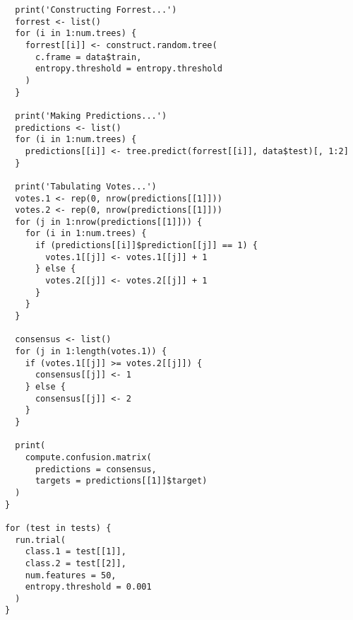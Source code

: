 \documentclass{article}
\begin{document}
\begin{verbatim}
  print('Constructing Forrest...')
  forrest <- list()
  for (i in 1:num.trees) {
    forrest[[i]] <- construct.random.tree(
      c.frame = data$train,
      entropy.threshold = entropy.threshold
    )
  }

  print('Making Predictions...')
  predictions <- list()
  for (i in 1:num.trees) {
    predictions[[i]] <- tree.predict(forrest[[i]], data$test)[, 1:2]
  }

  print('Tabulating Votes...')
  votes.1 <- rep(0, nrow(predictions[[1]]))
  votes.2 <- rep(0, nrow(predictions[[1]]))
  for (j in 1:nrow(predictions[[1]])) {
    for (i in 1:num.trees) {
      if (predictions[[i]]$prediction[[j]] == 1) {
        votes.1[[j]] <- votes.1[[j]] + 1
      } else {
        votes.2[[j]] <- votes.2[[j]] + 1
      }
    }
  }

  consensus <- list()
  for (j in 1:length(votes.1)) {
    if (votes.1[[j]] >= votes.2[[j]]) {
      consensus[[j]] <- 1
    } else {
      consensus[[j]] <- 2
    }
  }

  print(
    compute.confusion.matrix(
      predictions = consensus,
      targets = predictions[[1]]$target)
  )
}

for (test in tests) {
  run.trial(
    class.1 = test[[1]],
    class.2 = test[[2]],
    num.features = 50,
    entropy.threshold = 0.001
  )
}

\end{verbatim}
%
\end{document}
